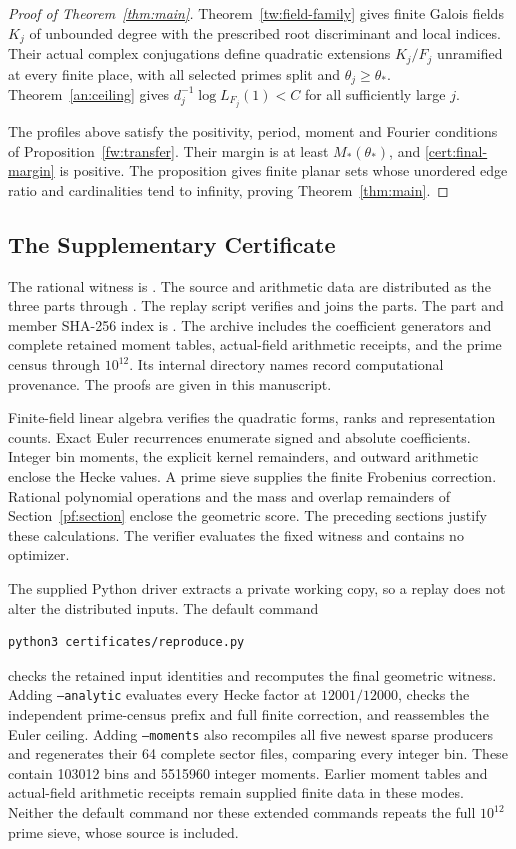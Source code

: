 \begin{proof}[Proof of Theorem~\ref{thm:main}]
Theorem~\ref{tw:field-family} gives finite Galois fields $K_j$ of unbounded
degree with the prescribed root discriminant and local indices. Their
actual complex conjugations define quadratic extensions $K_j/F_j$
unramified at every finite place, with all selected primes split and
$\theta_j\ge\theta_*$. Theorem~\ref{an:ceiling} gives
$d_j^{-1}\log L_{F_j}(1)<C$ for all sufficiently large $j$.

The profiles above satisfy the positivity, period, moment and Fourier
conditions of Proposition~\ref{fw:transfer}. Their margin is at least
$M_*(\theta_*)$, and \eqref{cert:final-margin} is positive. The
proposition gives finite planar sets whose unordered edge ratio and
cardinalities tend to infinity, proving Theorem~\ref{thm:main}.
\end{proof}

\subsection{The Supplementary Certificate}
The rational witness is . The source and arithmetic
data are distributed as the three parts
 through .
The replay script verifies and joins the parts. The part and
member SHA-256 index is .
The archive includes the
coefficient generators and complete retained moment tables, actual-field
arithmetic receipts, and the prime census through $10^{12}$. Its internal
directory names record computational provenance. The proofs are given
in this manuscript.

Finite-field linear algebra verifies the quadratic forms, ranks and
representation counts. Exact Euler recurrences enumerate signed and
absolute coefficients. Integer bin moments, the explicit kernel
remainders, and outward arithmetic enclose the Hecke values. A prime
sieve supplies the finite Frobenius correction. Rational polynomial
operations and the mass and overlap remainders of
Section~\ref{pf:section} enclose the geometric score. The preceding
sections justify these calculations. The verifier evaluates the fixed
witness and contains no optimizer.

The supplied Python driver extracts a private working copy, so a replay
does not alter the distributed inputs. The default command
\begin{verbatim}
python3 certificates/reproduce.py
\end{verbatim}
checks the retained input identities and recomputes the final geometric
witness. Adding \texttt{--analytic} evaluates
every Hecke factor at $12001/12000$, checks the independent prime-census
prefix and full finite correction, and reassembles the Euler ceiling.
Adding \texttt{--moments} also recompiles all five newest sparse producers
and regenerates their 64 complete sector files, comparing every integer
bin. These contain 103012 bins and 5515960 integer moments. Earlier
moment tables and actual-field arithmetic receipts remain supplied
finite data in these modes. Neither the default command nor these
extended commands repeats the full $10^{12}$ prime sieve, whose source
is included.

